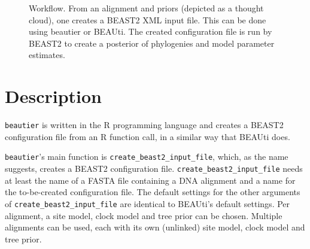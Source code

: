 \documentclass{article}
\begin{document}
\begin{figure}

  \caption{
    Workflow. From an alignment and priors (depicted as a thought cloud), one creates a BEAST2 XML input file. This
    can be done using beautier or BEAUti. The created configuration file is run by BEAST2
    to create a posterior of phylogenies and model parameter estimates.
  }
  \label{fig:workflow}
\end{figure}

\section{Description}

\verb;beautier; is written in the R programming language \cite{R}
and creates a BEAST2 configuration file from an R function call,
in a similar way that BEAUti does.

\verb;beautier;'s main function is \verb;create_beast2_input_file;, which, 
as the name suggests, creates a BEAST2 configuration file. 
\verb;create_beast2_input_file; needs at least the name of a 
FASTA file containing a DNA alignment
and a name for the to-be-created configuration file. 
The default settings for the other arguments of \verb;create_beast2_input_file; 
are identical to BEAUti's default settings.
Per alignment, a site model, clock model and tree prior can be chosen.
Multiple alignments can be used, each with its own (unlinked) site model, clock model and tree prior.
\end{document}
